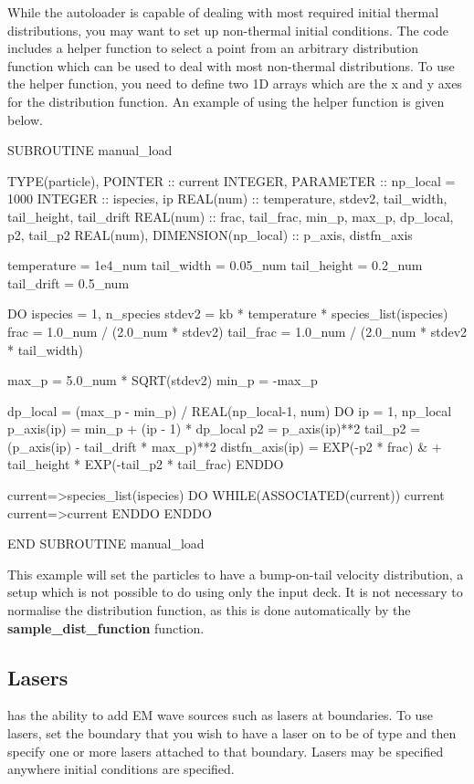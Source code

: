 While the autoloader is capable of dealing with most required initial thermal
distributions, you may want to set up non-thermal initial conditions. The code
includes a helper function to select a point from an arbitrary distribution
function which can be used to deal with most non-thermal distributions. To use
the helper function, you need to define two 1D arrays which are the x and
y axes for the distribution function. An example of using the helper function
is given below.
\begin{boxverbatim}
  SUBROUTINE manual_load

    TYPE(particle), POINTER :: current
    INTEGER, PARAMETER :: np_local = 1000
    INTEGER :: ispecies, ip
    REAL(num) :: temperature, stdev2, tail_width, tail_height, tail_drift
    REAL(num) :: frac, tail_frac, min_p, max_p, dp_local, p2, tail_p2
    REAL(num), DIMENSION(np_local) :: p_axis, distfn_axis

    temperature = 1e4_num
    tail_width = 0.05_num
    tail_height = 0.2_num
    tail_drift = 0.5_num

    DO ispecies = 1, n_species
      stdev2 = kb * temperature * species_list(ispecies)%
      frac = 1.0_num / (2.0_num * stdev2)
      tail_frac = 1.0_num / (2.0_num * stdev2 * tail_width)

      max_p = 5.0_num * SQRT(stdev2)
      min_p = -max_p

      dp_local = (max_p - min_p) / REAL(np_local-1, num)
      DO ip = 1, np_local
        p_axis(ip) = min_p + (ip - 1) * dp_local
        p2 = p_axis(ip)**2
        tail_p2 = (p_axis(ip) - tail_drift * max_p)**2
        distfn_axis(ip) = EXP(-p2 * frac) &
            + tail_height * EXP(-tail_p2 * tail_frac)
      ENDDO

      current=>species_list(ispecies)%
      DO WHILE(ASSOCIATED(current))
        current%
        current=>current%
      ENDDO
    ENDDO

  END SUBROUTINE manual_load
\end{boxverbatim}

This example will set the particles to have a bump-on-tail velocity
distribution, a setup which is not possible to do using only the
input deck. It is not necessary to normalise
the distribution function, as this is done automatically by the
{\bf sample\_dist\_function} function.


\subsection{Lasers}
{\EPOCH} has the ability to add EM wave sources such as
lasers at boundaries. To use lasers, set the boundary that you
wish to have a laser on to be of type  and then
specify one or more lasers attached to that boundary. Lasers may be specified
anywhere initial conditions are specified.

